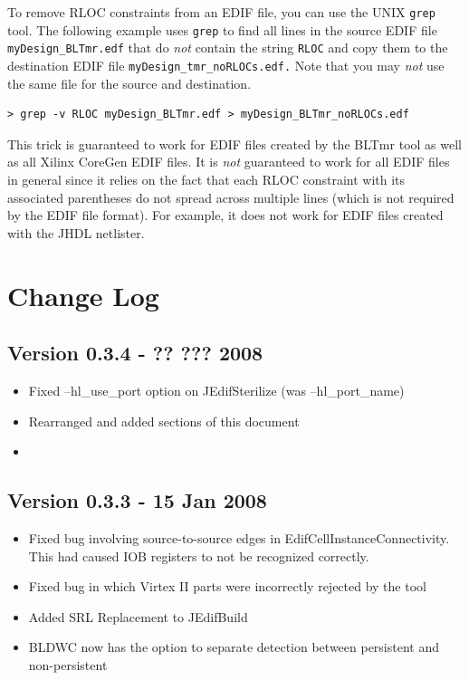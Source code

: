 \documentclass[english]{article}
\begin{document}
To remove RLOC constraints from an EDIF file, you can use the UNIX 
\texttt{grep} tool. The following example uses \texttt{grep} to find all lines 
in the source EDIF file \texttt{myDesign\_BLTmr.edf} that do \emph{not} contain 
the string \texttt{RLOC} and copy them to the destination EDIF file 
\texttt{myDesign\_tmr\_noRLOCs.edf.} Note that you may \emph{not} use the same 
file for the source and destination.

\begin{verbatim}
> grep -v RLOC myDesign_BLTmr.edf > myDesign_BLTmr_noRLOCs.edf
\end{verbatim}

This trick is guaranteed to work for EDIF files created by the BLTmr tool as 
well as all Xilinx CoreGen EDIF files. It is \emph{not} guaranteed to work for 
all EDIF files in general since it relies on the fact that each RLOC constraint 
with its associated parentheses do not spread across multiple lines (which is 
not required by the EDIF file format). For example, it does not work for EDIF 
files created with the JHDL netlister.

\section{Change Log}

\subsection*{Version 0.3.4 - ?? ??? 2008}
\begin{itemize}
\item Fixed --hl\_use\_port option on JEdifSterilize (was --hl\_port\_name)
\item Rearranged and added sections of this document
\item 
\end{itemize}

\subsection*{Version 0.3.3 - 15 Jan 2008}
\begin{itemize}
\item Fixed bug involving source-to-source edges in
EdifCellInstanceConnectivity. This had caused IOB registers to not be recognized
correctly.
\item Fixed bug in which Virtex II parts were incorrectly rejected by the tool
\item Added SRL Replacement to JEdifBuild
\item BLDWC now has the option to separate detection between persistent and
non-persistent
\end{itemize}
\end{document}
